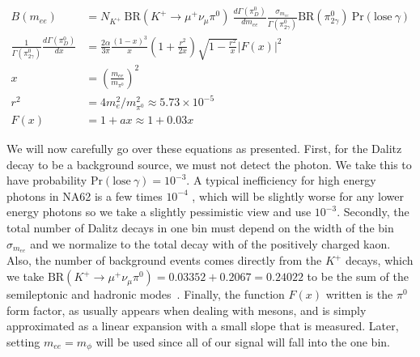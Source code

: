 \begin{align}
\label{eqn:kaon_dalitz_background}
B(m_{ee}) &= N_{K^+}~\textrm{BR}(K^+ \rightarrow \mu^+ \nu_\mu \pi^0)~\frac{d\Gamma(\pi^0_D)}{d m_{ee}} \frac{\sigma_{m_{ee}}}{\Gamma(\pi^0_{2\gamma})} \textrm{BR}(\pi^0_{2\gamma})~\textrm{Pr}(\textrm{lose}~\gamma) \\
\frac{1}{\Gamma(\pi^0_{2\gamma})} \frac{d\Gamma(\pi^0_D)}{dx} &= \frac{2\alpha}{3\pi} \frac{(1-x)^3}{x}(1+\frac{r^2}{2x})\sqrt{1-\frac{r^2}{x}}\left|F(x)\right|^2 \\
x &= \left(\frac{m_{ee}}{m_{\pi^0}}\right)^2 \\
r^2 &= 4 m_e^2 / m_{\pi^0}^2 \approx 5.73\times 10^{-5} \\
F(x) &= 1 + ax \approx 1+0.03x
\end{align}

We will now carefully go over these equations as presented.
First, for the Dalitz decay to be a background source, we must not detect the photon.
We take this to have probability $\textrm{Pr}(\textrm{lose}~\gamma) = 10^{-3}$.
A typical inefficiency for high energy photons in NA62 is a few times $10^{-4}$ \cite{Martellotti:2015kna}, which will be slightly worse for any lower energy photons so we take a slightly pessimistic view and use $10^{-3}$.
Secondly, the total number of Dalitz decays in one bin must depend on the width of the bin $\sigma_{m_{ee}}$ and we normalize to the total decay with of the positively charged kaon.
Also, the number of background events comes directly from the $K^+$ decays, which we take $\textrm{BR}(K^+ \rightarrow \mu^+ \nu_\mu \pi^0) = 0.03352 + 0.2067 = 0.24022$ to be the sum of the semileptonic and hadronic modes~\cite{Agashe:2014kda}.
Finally, the function $F(x)$ written is the $\pi^0$ form factor, as usually appears when dealing with mesons, and is simply approximated as a linear expansion with a small slope that is measured.
Later, setting $m_{ee} = m_\phi$ will be used since all of our signal will fall into the one bin.

